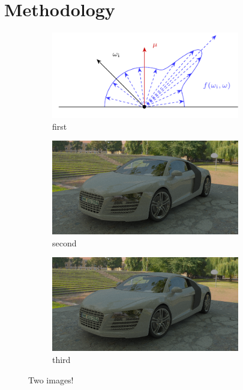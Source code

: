 \documentclass[a4paper]{article}
\begin{document}
  \section{Methodology}
    \begin{figure}
      \center
      \begin{subfigure}[b]{0.49\textwidth}
        \center
        \includegraphics[width=0.9\textwidth]{brdf_1.pdf}
        \caption{first}
      \end{subfigure}
      \begin{subfigure}[b]{0.49\textwidth}
        \center
        \includegraphics[width=0.9\textwidth]{example-audi_r8-pt.png}
        \caption{second}
      \end{subfigure}

      \begin{subfigure}[b]{0.99\textwidth}
        \center
        \includegraphics[width=0.9\textwidth]{example-audi_r8-pt.png}
        \caption{third}
      \end{subfigure}
      \caption[Wow!]{Two images!}
    \end{figure}
\end{document}

